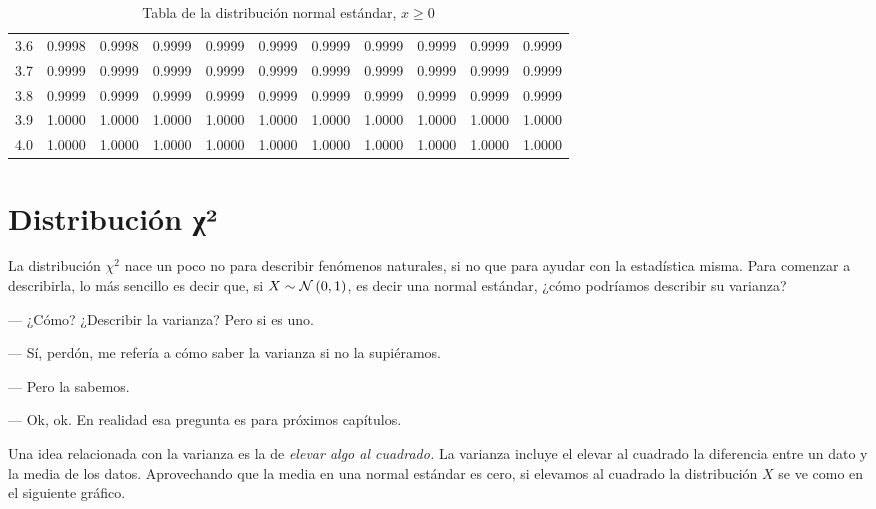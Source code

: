 \begin{table}
{\begin{tabular}{|T{1.1}|T{1.4}|T{1.4}|T{1.4}|T{1.4}|T{1.4}|T{1.4}|T{1.4}|T{1.4}|T{1.4}|T{1.4}|}
3.6 & 0.9998 & 0.9998 & 0.9999 & 0.9999 & 0.9999 & 0.9999 & 0.9999 & 0.9999 & 0.9999 & 0.9999 \\
3.7 & 0.9999 & 0.9999 & 0.9999 & 0.9999 & 0.9999 & 0.9999 & 0.9999 & 0.9999 & 0.9999 & 0.9999 \\
3.8 & 0.9999 & 0.9999 & 0.9999 & 0.9999 & 0.9999 & 0.9999 & 0.9999 & 0.9999 & 0.9999 & 0.9999 \\
3.9 & 1.0000 & 1.0000 & 1.0000 & 1.0000 & 1.0000 & 1.0000 & 1.0000 & 1.0000 & 1.0000 & 1.0000 \\
4.0 & 1.0000 & 1.0000 & 1.0000 & 1.0000 & 1.0000 & 1.0000 & 1.0000 & 1.0000 & 1.0000 & 1.0000 \\
\hline
\end{tabular}
}
\caption{Tabla de la distribución normal estándar, \(x \geq 0\)}
\label{tab:normal_standard2}
\end{table}

\section{Distribución χ²}

La distribución \(\chi^2\) nace un poco no para describir fenómenos naturales, si no que para ayudar con la estadística misma. Para comenzar a describirla, lo más sencillo es decir que, si \(X\sim\operatorname{\mathcal{N}}\left( 0, 1 \right)\), es decir una normal estándar, ¿cómo podríamos describir su varianza?

--- ¿Cómo? ¿Describir la varianza? Pero si es uno.

--- Sí, perdón, me refería a cómo saber la varianza si no la supiéramos.

--- Pero la sabemos.

--- Ok, ok. En realidad esa pregunta es para próximos capítulos.

Una idea relacionada con la varianza es la de \emph{elevar algo al cuadrado.} La varianza incluye el elevar al cuadrado la diferencia entre un dato y la media de los datos. Aprovechando que la media en una normal estándar es cero, si elevamos al cuadrado la distribución \(X\)  se ve como en el siguiente gráfico.


